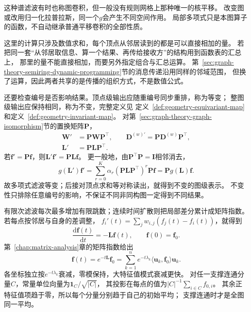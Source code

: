 这种谱滤波有时也称图卷积，但一般没有规则网格上那种唯一的核平移。
改变图或改用归一化拉普拉斯，同一个\(g\)会产生不同空间作用。
局部多项式只是本图算子的函数，不自动继承普通平移卷积的全部性质。

这里的计算只涉及数值求和，每个顶点从邻居读到的都是可以直接相加的量。
若把同一套“从邻居取信息、算一个结果、再传给接收方”的结构用到函数表的汇总上，
那里的量不能直接相加，而要另外指定组合与汇总运算。
第~\ref{sec:graph-theory-semiring-dynamic-programming}节的消息传递沿用同样的邻域范围，
但换了运算，因此两者共享的是传播的组织方式，不是数值公式。

还要检查编号是否影响结果。顶点级输出应随重编号同步重排，称为等变；
整图级输出应保持相同，称为不变，完整定义见
定义~\ref{def:geometry-equivariant-map}和定义~\ref{def:geometry-invariant-map}。
对第~\ref{sec:graph-theory-graph-isomorphism}节的置换矩阵\(\bm P\)，
\begin{equation}
  \begin{aligned}
    \bm W'&=\bm P\bm W\bm P^\top,\qquad
    \bm D^{(w)\prime}=\bm P\bm D^{(w)}\bm P^\top,\\
    \bm L'&=\bm P\bm L\bm P^\top.
  \end{aligned}
  \label{eq:graph-theory-laplacian-relabel}
\end{equation}
若\(\bm f'=\bm P\bm f\)，则\(\bm L'\bm f'=\bm P\bm L\bm f\)。
更一般地，由\(\bm P^\top\bm P=\bm I\)相邻消去，
\[
  g(\bm L')\bm f'
  =\sum_{r=0}^K\alpha_r(\bm P\bm L\bm P^\top)^r\bm P\bm f
  =\bm P g(\bm L)\bm f.
\]
故多项式滤波等变；后接对顶点求和等对称读出，就得到不变的图级表示。
不变性只排除任意编号的影响，不保证不同非同构图一定得到不同结果。

有限次滤波每次最多增加有限跳数；连续时间扩散则把局部差分累计成矩阵指数。
若每点按邻居与自身的差调整，
\(f_i'(t)=\sum_jw_{i,j}(f_j(t)-f_i(t))\)，就得到
\begin{equation}
  \frac{\mathrm d\bm f(t)}{\mathrm dt}=-\bm L\bm f(t),\qquad
  \bm f(0)=\bm f_0.
  \label{eq:graph-theory-heat-equation}
\end{equation}
第~\ref{chap:matrix-analysis}章的矩阵指数给出
\[
  \bm f(t)=e^{-t\bm L}\bm f_0
  =\sum_{k=1}^ne^{-t\lambda_k}
    \langle\bm u_k,\bm f_0\rangle\bm u_k.
\]
各坐标独立按\(e^{-t\lambda_k}\)衰减，零模保持，大特征值模式衰减更快。
对任一支撑连通分量\(C\)，常量单位向量为\(\bm1_C/\sqrt{|C|}\)，
其投影在每点的值为\(|C|^{-1}\sum_{i\in C}f_{0,i}\)。
其余正特征值项趋于零，所以每个分量分别趋于自己的初始平均；
支撑连通时才是全图同一平均。

